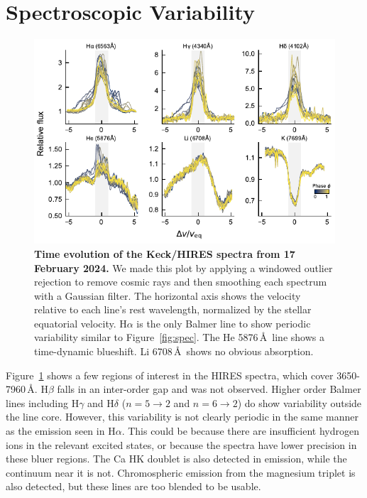 \documentclass[11pt,twocolumn,tighten,linenumbers]{aastex7}
\begin{document}
\section{Spectroscopic Variability}
\label{subsec:specvar}

\begin{figure}[!t]
  \centering
  \includegraphics[width=\textwidth]{f8.pdf}
  \vspace{-0.5cm}
  \caption{{\bf Time evolution of the Keck/HIRES spectra
  from 17 February 2024.}  We made this plot by applying a windowed
  outlier rejection to remove cosmic rays and then smoothing each
  spectrum with a Gaussian filter.  The horizontal axis shows the
  velocity relative to each line's rest wavelength, normalized by the
  stellar equatorial velocity.  H$\alpha$ is the only Balmer line to
  show periodic variability similar to Figure~\ref{fig:spec}.
	The He 5876\,\AA\ line shows a time-dynamic blueshift.  Li 6708\,\AA\ shows
	no obvious absorption. }
  \label{fig:hirescuts}
\end{figure}

Figure~\ref{fig:hirescuts} shows a few regions of
interest in the HIRES spectra, which cover 3650-7960\,\AA.  
H$\beta$ falls in an inter-order gap and was not observed.
Higher order Balmer lines including H$\gamma$ and H$\delta$
($n=5\rightarrow2$ and $n=6\rightarrow2$) do show variability outside
the line core.  However, this variability is not clearly periodic in the
same manner as the emission seen in H$\alpha$.  This could be because
there are insufficient hydrogen ions in the relevant excited states, or
because the spectra have lower precision in these bluer regions.  The Ca
HK doublet is also detected in emission, while the continuum near it is
not.  Chromospheric emission from the magnesium triplet is also
detected, but these lines are too blended to be usable.
\end{document}
